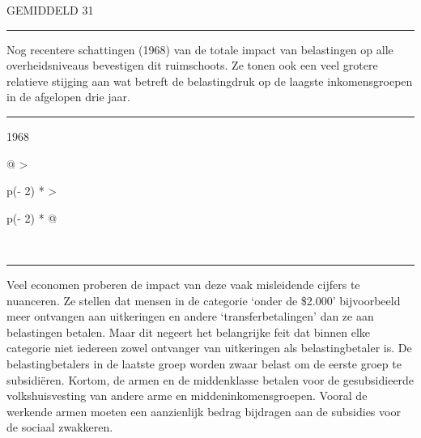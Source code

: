\documentclass[
  a5paper,
  smalldemyvopaper,10pt,twoside,onecolumn,openright,extrafontsizes,hidelinks]{memoir}
\renewenvironment{quote}%
               {\list{}{\rightmargin=.6cm\leftmargin=.6cm}%
                \itshape \item[]}%
               {\endlist}
\begin{document}
\begin{quote}
GEMIDDELD 31
\end{quote}

\begin{center}\rule{0.5\linewidth}{0.5pt}\end{center}

Nog recentere schattingen (1968) van de totale impact van belastingen op
alle overheidsniveaus bevestigen dit ruimschoots. Ze tonen ook een veel
grotere relatieve stijging aan wat betreft de belastingdruk op de
laagste inkomensgroepen in de afgelopen drie jaar.

\begin{center}\rule{0.5\linewidth}{0.5pt}\end{center}

1968

\begin{longtable}[]{@{}
  >{\raggedright\arraybackslash}p{(\columnwidth - 2\tabcolsep) * }
  >{\raggedright\arraybackslash}p{(\columnwidth - 2\tabcolsep) * }@{}}
\toprule\noalign{}
\endhead
\bottomrule\noalign{}
\endlastfoot
{} \\
\end{longtable}

\begin{center}\rule{0.5\linewidth}{0.5pt}\end{center}

Veel economen proberen de impact van deze vaak misleidende cijfers te
nuanceren. Ze stellen dat mensen in de categorie `onder de \$2.000'
bijvoorbeeld meer ontvangen aan uitkeringen en andere
`transferbetalingen' dan ze aan belastingen betalen. Maar dit negeert
het belangrijke feit dat binnen elke categorie niet iedereen zowel
ontvanger van uitkeringen als belastingbetaler is. De belastingbetalers
in de laatste groep worden zwaar belast om de eerste groep te
subsidiëren. Kortom, de armen en de middenklasse betalen voor de
gesubsidieerde volkshuisvesting van andere arme en
middeninkomensgroepen. Vooral de werkende armen moeten een aanzienlijk
bedrag bijdragen aan de subsidies voor de sociaal zwakkeren.
\end{document}
